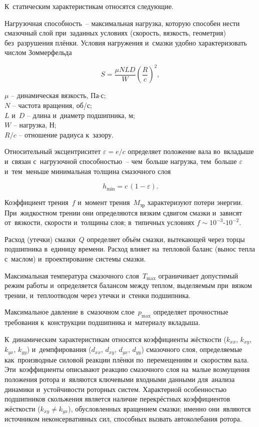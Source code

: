 К~статическим характеристикам относятся следующие.

Нагрузочная способность~-- максимальная нагрузка, которую способен нести смазочный слой при~заданных условиях (скорость, вязкость, геометрия) без~разрушения плёнки. Условия нагружения и~смазки удобно характеризовать числом Зоммерфельда

\begin{equation}
S = \dfrac{\mu N L D}{W}\left(\dfrac{R}{c}\right)^2,
\end{equation}
\begin{conditions}
$\mu$ -- динамическая вязкость, Па$\cdot$с;\\
$N$ -- частота вращения, об/с;\\
$L$ и~$D$ -- длина и~диаметр подшипника, м;\\
$W$ -- нагрузка, Н;\\
$R/c$ -- отношение радиуса к~зазору.
\end{conditions}
Относительный эксцентриситет $\varepsilon = e/c$ определяет положение вала во~вкладыше и~связан с~нагрузочной способностью~-- чем~больше нагрузка, тем~больше $\varepsilon$ и~тем~меньше минимальная толщина смазочного слоя

\begin{equation}
h_{\min} = c\,(1-\varepsilon).
\end{equation}

Коэффициент трения~$f$ и~момент трения~$M_{\text{тр}}$ характеризуют потери энергии. При~жидкостном трении они определяются вязким сдвигом смазки и~зависят от~вязкости, скорости и~толщины слоя; в~типичных условиях $f \sim 10^{-3}\text{-}10^{-2}$.

Расход (утечки) смазки~$Q$ определяет объём смазки, вытекающей через торцы подшипника в~единицу времени. Расход влияет на~тепловой баланс (вынос тепла с~маслом) и~проектирование системы смазки.

Максимальная температура смазочного слоя~$T_{\max}$ ограничивает допустимый режим работы и~определяется балансом между теплом, выделяемым при~вязком трении, и~теплоотводом через утечки и~стенки подшипника.

Максимальное давление в~смазочном слое~$p_{\max}$ определяет прочностные требования к~конструкции подшипника и~материалу вкладыша.

К~динамическим характеристикам относятся коэффициенты жёсткости ($k_{xx}$, $k_{xy}$, $k_{yx}$, $k_{yy}$) и~демпфирования ($d_{xx}$, $d_{xy}$, $d_{yx}$, $d_{yy}$) смазочного слоя, определяемые как~производные силовой реакции плёнки по~перемещениям и~скоростям вала. Эти~коэффициенты описывают реакцию смазочного слоя на~малые возмущения положения ротора и~являются ключевыми входными данными для~анализа динамики и~устойчивости роторных систем. Характерной особенностью подшипников скольжения является наличие перекрёстных коэффициентов жёсткости ($k_{xy} \neq k_{yx}$), обусловленных вращением смазки; именно они~являются источником неконсервативных сил, способных вызвать автоколебания ротора.

